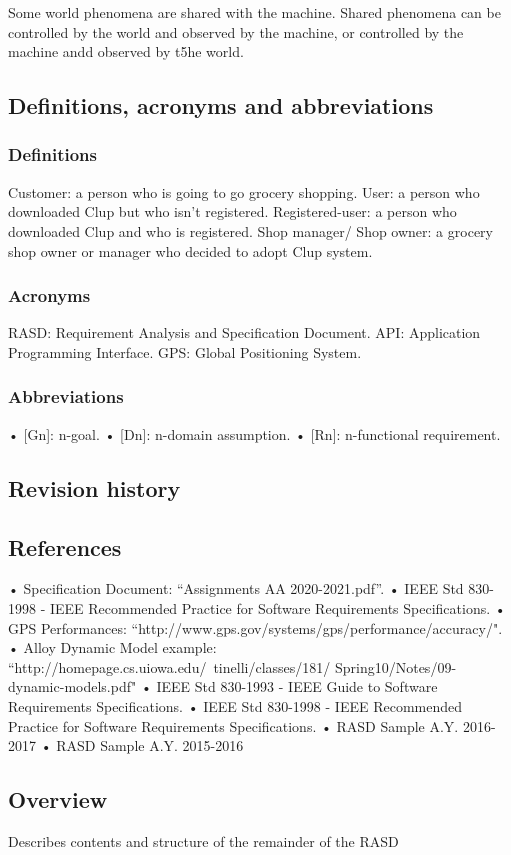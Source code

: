 Some world phenomena are shared with the machine.
Shared phenomena can be controlled by the world and observed by the machine, or controlled by the machine andd observed by t5he world.

\subsection{Definitions, acronyms and abbreviations}
\label{subsect:definitionsacronymsabbreviations}

\subsubsection{Definitions}
\label{subsect:definitions}
Customer: a person who is going to go grocery shopping.
User: a person who downloaded Clup but who isn't registered.
Registered-user: a person who downloaded Clup and who is registered.
Shop manager/ Shop owner: a grocery shop owner or manager who decided to adopt Clup system.

\subsubsection{Acronyms}
\label{subsect:acronyms}
RASD: Requirement Analysis and Specification Document.
API: Application Programming Interface.
GPS: Global Positioning System.

\subsubsection{Abbreviations}
\label{subsect:abbreviations}
• [Gn]: n-goal.
• [Dn]: n-domain assumption.
• [Rn]: n-functional requirement.


\subsection{Revision history}
\label{subsect:revisionhistory}

\subsection{References}
\label{subsect:references}
• Specification Document: “Assignments AA 2020-2021.pdf”.
• IEEE Std 830-1998 - IEEE Recommended Practice for Software Requirements Specifications.
• GPS Performances: “http://www.gps.gov/systems/gps/performance/accuracy/".
• Alloy Dynamic Model example: “http://homepage.cs.uiowa.edu/~tinelli/classes/181/
Spring10/Notes/09-dynamic-models.pdf"
• IEEE Std 830-1993 - IEEE Guide to Software Requirements Specifications.
• IEEE Std 830-1998 - IEEE Recommended Practice for Software Requirements Specifications.
• RASD Sample A.Y. 2016-2017
• RASD Sample A.Y. 2015-2016


\subsection{Overview}
\label{subsect:overview}

Describes contents and structure of the remainder of the RASD